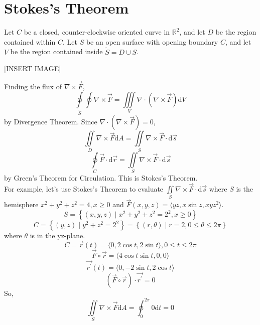 \section{Stokes's Theorem}
\noindent
Let $C$ be a closed, counter-clockwise oriented curve in $\mathbb{R}^2$, and let $D$ be the region contained within $C$. Let $S$ be an open surface with opening boundary $C$, and let $V$ be the region contained inside $\tilde{S} = D \cup S$.

[INSERT IMAGE]

\noindent
Finding the flux of $\nabla \times \vec{F}$,
\begin{equation*}
	\oint\limits_{\tilde{S}}\oint{\nabla \times \vec{F}} = \iiint\limits_{V}{\nabla \cdot (\nabla \times \vec{F})\mathrm{d}V}
\end{equation*}
by Divergence Theorem. Since $\nabla \cdot (\nabla \times \vec{F}) = 0$, 
\begin{equation*}
	\iint\limits_{D}{\nabla \times \vec{F}\mathrm{d}A} = \iint\limits_{S}{\nabla \times \vec{F} \cdot \mathrm{d}\vec{s}}	
\end{equation*}
\begin{equation*}
	\oint\limits_{C}{\vec{F} \cdot \mathrm{d}\vec{r}} = \iint\limits_{S}{\nabla \times \vec{F} \cdot \mathrm{d}\vec{s}}
\end{equation*}
by Green's Theorem for Circulation. This is Stokes's Theorem.\\

\noindent
For example, let's use Stokes's Theorem to evaluate $\iint\limits_{S}{\nabla \times \vec{F} \cdot \mathrm{d}\vec{s}}$ where $S$ is the hemisphere $x^2 + y^2 + z^2 = 4, x \geq 0$ and $\vec{F}(x,y,z) = \langle yz, x\sin{z}, xyz^2 \rangle$.
\begin{equation*}
	S = \left\{(x,y,z) \mid x^2 + y^2 + z^2 = 2^2, x \geq 0 \right\}	
\end{equation*}
\begin{equation*}
	C = \left\{(y,z) \mid y^2 + z^2 = 2^2 \right\} = \left\{(r,\theta) \mid r = 2, 0 \leq \theta \leq 2\pi \right\}
\end{equation*}
where $\theta$ is in the yz-plane.
\begin{equation*}
	C = \vec{r}(t) = \langle 0, 2\cos{t}, 2\sin{t} \rangle, 0 \leq t \leq 2\pi
\end{equation*}
\begin{equation*}
	\vec{F}\circ\vec{r} = \langle 4\cos{t}\sin{t}, 0, 0 \rangle	
\end{equation*}
\begin{equation*}
	\vec{r^\prime}(t) = \langle 0, -2\sin{t}, 2\cos{t}\rangle
\end{equation*}
\begin{equation*}
	\left(\vec{F}\circ\vec{r}\right) \cdot \vec{r^\prime} = 0	
\end{equation*}
So, 
\begin{equation*}
	\iint\limits_{S}{\nabla \times \vec{F}\mathrm{d}A} = \oint_{0}^{2\pi}{0\mathrm{d}t} = 0
\end{equation*}

